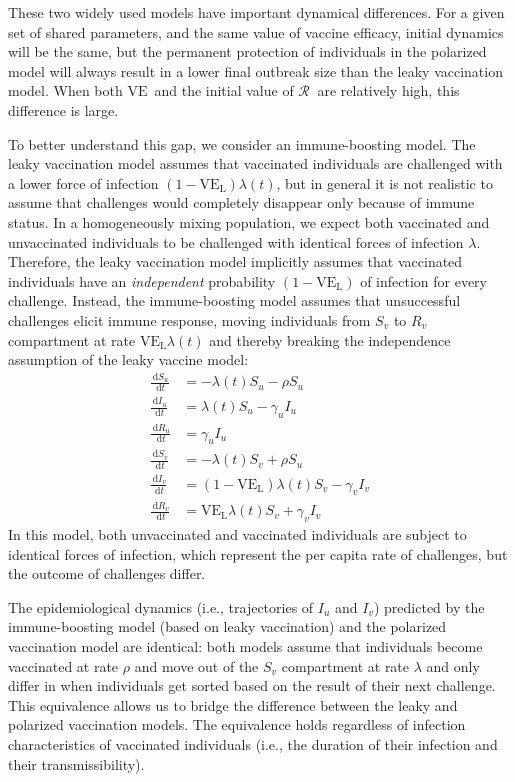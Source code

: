\documentclass[12pt]{article}
\newcommand{\Rx}[1]{\ensuremath{{\mathcal R}_{#1}}\xspace}
\newcommand{\dd}[1]{\ensuremath{\, \mathrm{d}#1}}
\newcommand{\VE}{\ensuremath{\mathrm{VE}}}
\newcommand{\VEL}{\ensuremath{\VE_{\mathrm{L}}}}
\begin{document}
These two widely used models have important dynamical differences. For a given set of shared parameters, and the same value of vaccine efficacy, initial dynamics will be the same, but the permanent protection of individuals in the polarized model will always result in a lower final outbreak size than the leaky vaccination model. When both \VE\ and the initial value of \Rx\ are relatively high, this difference is large.

To better understand this gap, we consider an immune-boosting model.
The leaky vaccination model assumes that vaccinated individuals are challenged with a lower force of infection $(1-\VEL) \lambda(t)$, but in general it is not realistic to assume that challenges would completely disappear only because of immune status.
In a homogeneously mixing population, we expect both vaccinated and unvaccinated individuals to be challenged with identical forces of infection $\lambda$.
Therefore, the leaky vaccination model implicitly assumes that vaccinated individuals have an \emph{independent} probability $(1-\VEL)$ of infection for every challenge.
Instead, the immune-boosting model assumes that unsuccessful challenges elicit immune response, moving individuals from $S_v$ to $R_v$ compartment at rate $\VEL \lambda(t)$ and thereby breaking the independence assumption of the leaky vaccine model:  
\begin{align}
\frac{\dd S_u}{\dd t} &= - \lambda(t) S_u - \rho S_u \\
\frac{\dd I_u}{\dd t} &= \lambda(t) S_u - \gamma_u I_u \\
\frac{\dd R_u}{\dd t} &= \gamma_u I_u \\
\frac{\dd S_v}{\dd t} &= - \lambda(t) S_v + \rho S_u \\
\frac{\dd I_v}{\dd t} &= (1-\VEL) \lambda(t) S_v - \gamma_v I_v \\
\frac{\dd R_v}{\dd t} &= \VEL \lambda(t) S_v + \gamma_v I_v
\end{align}
In this model, both unvaccinated and vaccinated individuals are subject to identical forces of infection, which represent the per capita rate of challenges, but the outcome of challenges differ.

The epidemiological dynamics (i.e., trajectories of $I_u$ and $I_v$) predicted by the immune-boosting model (based on leaky vaccination) and the polarized vaccination model are identical: 
both models assume that individuals become vaccinated at rate $\rho$ and move out of the $S_v$ compartment at rate $\lambda$ and only differ in when individuals get sorted based on the result of their next challenge.
This equivalence allows us to bridge the difference between the leaky and polarized vaccination models.
The equivalence holds regardless of infection characteristics of vaccinated individuals (i.e., the duration of their infection and their transmissibility).
\end{document}
